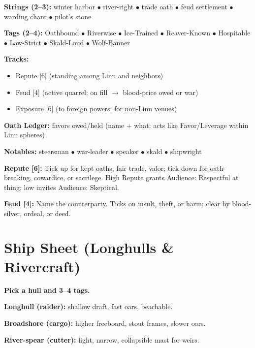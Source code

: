 \documentclass[11pt]{article}
\begin{document}
\textbf{Strings (2--3):} winter harbor $\bullet$ river-right $\bullet$ trade oath $\bullet$ feud settlement $\bullet$ warding chant $\bullet$ pilot's stone

\textbf{Tags (2--4):} Oathbound $\bullet$ Riverwise $\bullet$ Ice-Trained $\bullet$ Reaver-Known $\bullet$ Hospitable $\bullet$ Law-Strict $\bullet$ Skald-Loud $\bullet$ Wolf-Banner

\textbf{Tracks:}
\begin{itemize}
\item Repute [6] (standing among Linn and neighbors)
\item Feud [4] (active quarrel; on fill $\rightarrow$ blood-price owed or war)
\item Exposure [6] (to foreign powers; for non-Linn venues)
\end{itemize}

\textbf{Oath Ledger:} favors owed/held (name + what; acts like Favor/Leverage within Linn spheres)

\textbf{Notables:} steersman $\bullet$ war-leader $\bullet$ speaker $\bullet$ skald $\bullet$ shipwright

\textbf{Repute [6]:} Tick up for kept oaths, fair trade, valor; tick down for oath-breaking, cowardice, or sacrilege. High Repute grants Audience: Respectful at thing; low invites Audience: Skeptical.

\textbf{Feud [4]:} Name the counterparty. Ticks on insult, theft, or harm; clear by blood-silver, ordeal, or deed.

\section{Ship Sheet (Longhulls \& Rivercraft)}

\textbf{Pick a hull and 3--4 tags.}

\textbf{Longhull (raider):} shallow draft, fast oars, beachable.

\textbf{Broadshore (cargo):} higher freeboard, stout frames, slower oars.

\textbf{River-spear (cutter):} light, narrow, collapsible mast for weirs.
\end{document}
